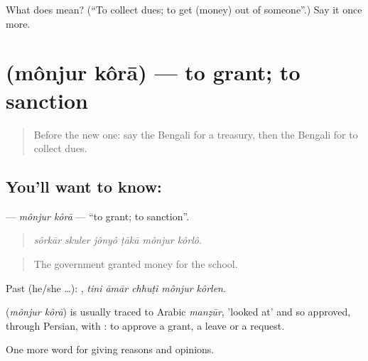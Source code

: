 \begin{tcolorbox}[breakable,colback=teal!4,colframe=teal!35!black,title={Before you move on}]
What does   mean? (\textquotedblleft{}To collect dues; to get (money) out of someone\textquotedblright{}.) Say it once more.
\end{tcolorbox}
\section[\texorpdfstring{\bn{মঞ্জুর} \bn{করা} (mônjur kôrā)}{মঞ্জুর করা (mônjur kôrā)}]{  (mônjur kôrā) — to grant; to sanction}

\label{lesson:BN-C348-monjur-kora}



\begin{quote}
Before the new one: say the Bengali for a treasury, then the Bengali for to collect dues.
\end{quote}

\subsection*{You'll want to know:  }
\textbf{ } — \emph{mônjur kôrā} — \textquotedblleft{}to grant; to sanction\textquotedblright{}.

\begin{quote}
     
\end{quote}

\begin{quote}
\emph{sôrkār skuler jônyô ṭākā mônjur kôrlô.}
\end{quote}

\begin{quote}
The government granted money for the school.
\end{quote}

Past (he/she …):     , \emph{tini āmār chhuṭi mônjur kôrlen}.

\begin{cousinweb}
\textbf{ } (\emph{mônjur kôrā}) is usually traced to Arabic \emph{manẓūr}, 'looked at' and so approved, through Persian, with : to approve a grant, a leave or a request.
\end{cousinweb}

\begin{grammarlens}[title={What you've built}]
One more word for giving reasons and opinions.
\end{grammarlens}

